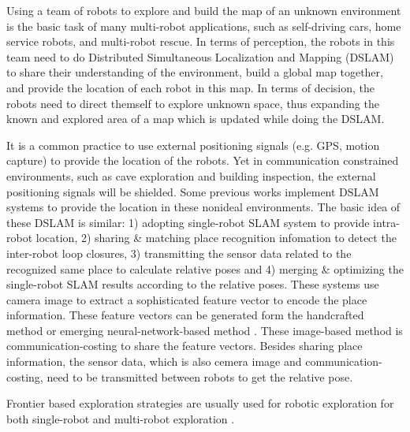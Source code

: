 Using a team of robots to explore and build the map of an unknown environment is the basic task of many multi-robot applications, such as self-driving cars, home service robots, and multi-robot rescue.
In terms of perception, the robots in this team need to do Distributed Simultaneous Localization and Mapping (DSLAM) to share their understanding of the environment, build a global map together, and provide the location of each robot in this map.
In terms of decision, the robots need to direct themself to explore unknown space, thus expanding the known and explored area of a map which is updated while doing the DSLAM.

It is a common practice to use external positioning signals (e.g. GPS, motion capture) to provide the location of the robots. 
Yet in communication constrained environments, such as cave exploration and building inspection, the external positioning signals will be shielded. 
Some previous works implement DSLAM systems \cite{cieslewski2018data,lajoie2020door} to provide the location in these nonideal environments. 
The basic idea of these DSLAM is similar: 1) adopting single-robot SLAM system to provide intra-robot location, 2) sharing \& matching place recognition infomation to detect the inter-robot loop closures, 3) transmitting the sensor data related to the recognized same place to calculate relative poses and 4) merging \& optimizing the single-robot SLAM results according to the relative poses. 
These systems use camera image to extract a sophisticated feature vector to encode the place information. 
These feature vectors can be generated form the handcrafted method \cite{jegou2014triang} or emerging neural-network-based method \cite{radenovic2018fine, arandjelovic2016netvlad}. 
These image-based  method is communication-costing to share the feature vectors. 
Besides sharing place information, the sensor data, which is also cemera image and communication-costing, need to be transmitted between robots to get the relative pose.

Frontier based exploration strategies are usually used for robotic exploration for both single-robot  and multi-robot exploration \cite{senarathne2013efficient, umari2017autonomous, orvsulic2019efficient}. 
